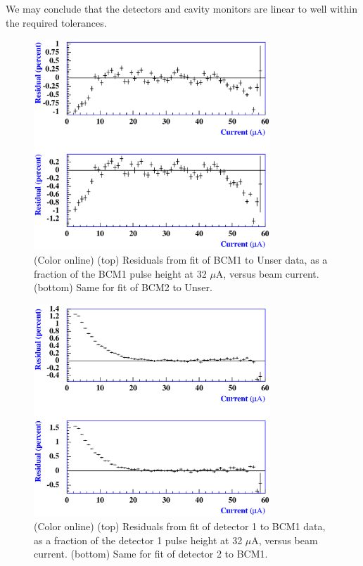 We may conclude that the detectors and cavity monitors are linear to
well within the required tolerances.

\begin{figure}
\begin{center}
\includegraphics[width=3.5in]{DW/fig24_rsh_linearbu.eps}
\caption{(Color online) (top) Residuals from fit of BCM1 to Unser data, as a fraction
of the BCM1 pulse height at 32 $\mu$A, versus beam current.  (bottom)
Same for fit of BCM2 to Unser.}
\label{Fig24_RSH_Linearbu} 
\end{center}
\end{figure}

\begin{figure}
\begin{center}
\includegraphics[width=3.5in]{DW/fig25_rsh_lineardb1.eps}
\caption{(Color online) (top) Residuals from fit of detector 1 to BCM1 data, as a fraction
of the detector 1 pulse height at 32 $\mu$A, versus beam current.  (bottom)
Same for fit of detector 2 to BCM1.}
\label{Fig25_RSH_Lineardb1} 
\end{center}
\end{figure}

